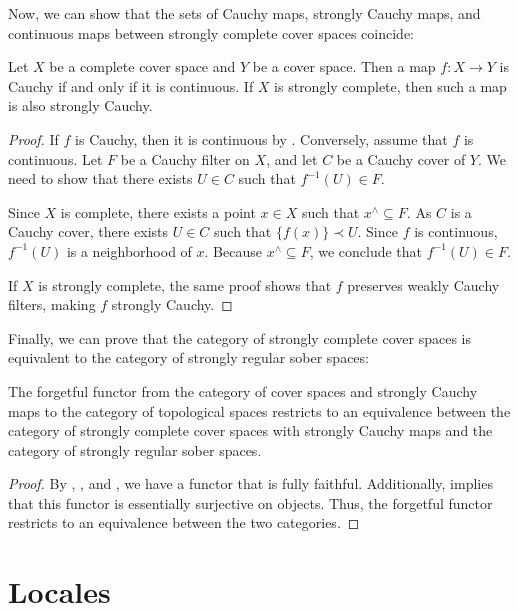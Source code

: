 \documentclass[pdflatex,sn-mathphys-num]{sn-jnl}
\theoremstyle{definition}
\theoremstyle{remark}
\numberwithin{figure}{section}
\newcommand{\rb}{\prec}
\begin{document}
Now, we can show that the sets of Cauchy maps, strongly Cauchy maps, and continuous maps between strongly complete cover spaces coincide:

\begin{prop}
Let $X$ be a complete cover space and $Y$ be a cover space.
Then a map $f : X \to Y$ is Cauchy if and only if it is continuous.
If $X$ is strongly complete, then such a map is also strongly Cauchy.
\end{prop}
\begin{proof}
If $f$ is Cauchy, then it is continuous by .
Conversely, assume that $f$ is continuous.
Let $F$ be a Cauchy filter on $X$, and let $C$ be a Cauchy cover of $Y$.
We need to show that there exists $U \in C$ such that $f^{-1}(U) \in F$.

Since $X$ is complete, there exists a point $x \in X$ such that $x^\wedge \subseteq F$.
As $C$ is a Cauchy cover, there exists $U \in C$ such that $\{ f(x) \} \rb U$.
Since $f$ is continuous, $f^{-1}(U)$ is a neighborhood of $x$.
Because $x^\wedge \subseteq F$, we conclude that $f^{-1}(U) \in F$.

If $X$ is strongly complete, the same proof shows that $f$ preserves weakly Cauchy filters, making $f$ strongly Cauchy.
\end{proof}

Finally, we can prove that the category of strongly complete cover spaces is equivalent to the category of strongly regular sober spaces:

\begin{thm}
The forgetful functor from the category of cover spaces and strongly Cauchy maps to the category of topological spaces restricts to an equivalence between the category of strongly complete cover spaces with strongly Cauchy maps and the category of strongly regular sober spaces.
\end{thm}
\begin{proof}
By , , and , we have a functor that is fully faithful.
Additionally,  implies that this functor is essentially surjective on objects.
Thus, the forgetful functor restricts to an equivalence between the two categories.
\end{proof}

\section{Locales}
\label{sec:locales}
\end{document}
